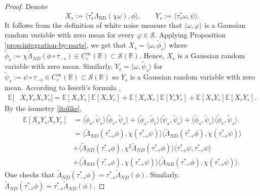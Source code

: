 \documentclass[10pt,a4paper]{article}
\theoremstyle{plain}
\theoremstyle{definition}
\theoremstyle{remark}
\numberwithin{equation}{section}
\newcommand{\R}{\mathbb{R}}
\newcommand{\E}{\mathbb{E}} %
\newcommand{\ND}{\Lambda_{\text{ND}}}
\begin{document}
\begin{proof}
Denote
  \begin{equation}
    X_s := \langle \tau_s^* \ND (\chi \omega ), \phi  \rangle, \qquad Y_s := \langle \tau_s^* \omega, \psi \rangle.
  \end{equation}
It follows from the definition of white noise measure that $  \langle \omega, \varphi \rangle $  is a Gaussian random variable with zero mean for every $\varphi \in \mathcal{S}$. 
Applying Proposition \ref{prop:integration-by-parts}, we get that 
$
X_s =  \langle  \omega , \tilde\phi_s \rangle$ where $ \tilde\phi_s := \chi  \tilde\Lambda_{ND} (\phi \circ \tau_{-s} ) \in C^\infty_c(\R) \subset \mathcal{S}(\R). $
Hence, $X_s$ is a Gaussian random variable with zero mean. 
Similarly, $Y_s = \langle \omega, \tilde\psi_s \rangle$ for $\tilde\psi_s:= \psi \circ \tau_{-s} \in C^\infty_c(\R) \subset \mathcal{S}(\R) $ so $Y_s$ is a Gaussian random variable with zero mean. 
According to Isserli's formula \cite{isserlis18_formul_produc_momen_coeff_any}, 
  \begin{align}\label{1eq:isserlis}
    \E[&X_sY_sX_{r}Y_{r}] = \E[X_sY_s] \E[X_{r}Y_{r}] 
       + \E[X_sX_{r}] \E[Y_sY_{r}] + \E[X_sY_{r}] \E[X_{r} Y_s]. 
  \end{align}
By the isometry \eqref{itolike}, 
  \begin{align}\label{isse2}
    \E[X_sY_sX_{r}Y_{r}] &= \langle  \tilde\phi_s,  \tilde\psi_s \rangle  \langle  \tilde\phi_{r},  \tilde\psi_{r}  \rangle+\langle  \tilde\phi_s,  \tilde\phi_{r} \rangle  \langle  \tilde\psi_{s},  \tilde\psi_{r}  \rangle+\langle  \tilde\phi_s,  \tilde\psi_{r} \rangle  \langle  \tilde\phi_{r},  \tilde\psi_{s}  \rangle. 
    \\
    &= \langle \tilde\Lambda_{ND} ( \tau_{-s}^* \phi  ),  \chi ( \tau_{-s}^* \psi ) \rangle \langle \tilde\Lambda_{ND} (\tau_{-r} ^* \phi ),  \chi (\tau_{-r}^* \psi )  \rangle \\
    &+\langle  \tilde\Lambda_{ND} (\tau_{-s}^* \phi ),  \chi^2  \tilde\Lambda_{ND} (\tau_{-r}^* \phi  )  \rangle \langle  \tau_{-s}^* \psi  ,   \tau_{-r}^* \psi  \rangle  \\
    &+ \langle   \tilde\Lambda_{ND} (\tau_{-s}^*\phi ),  \chi( \tau_{-r}^*\psi  ) \rangle \langle \tilde\Lambda_{ND} ( \tau_{-r}^*\phi  ),  \chi(  \tau_{-s}^*\psi ) \rangle. 
  \end{align}
One checks that $  \tilde\Lambda_{ND} ( \tau_{-s}^* \phi  ) =  \tau_{-s}^* \tilde\Lambda_{ND} (\phi)  $. Similarly, $  \tilde\Lambda_{ND} ( \tau_{-r}^* \phi  ) = \tau_{-r} ^*\tilde\Lambda_{ND} (\phi) $. 

\end{proof}
\end{document}
